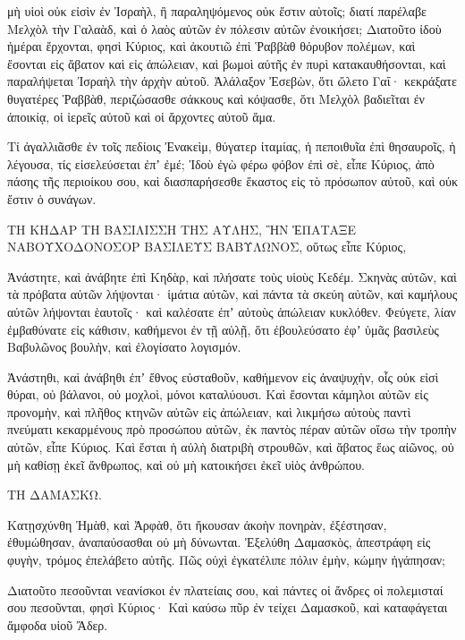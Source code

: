 {\par }{\PP μὴ υἱοὶ οὐκ εἰσὶν ἐν Ἰσραὴλ, ἢ παραληψόμενος οὐκ ἔστιν αὐτοῖς; διατί παρέλαβε Μελχὸλ τὴν Γαλαὰδ, καὶ ὁ λαὸς αὐτῶν ἐν πόλεσιν αὐτῶν ἐνοικήσει;
Διατοῦτο ἰδοὺ ἡμέραι ἔρχονται, φησὶ Κύριος, καὶ ἀκουτιῶ ἐπὶ Ῥαββὰθ θόρυβον πολέμων, καὶ ἔσονται εἰς ἄβατον καὶ εἰς ἀπώλειαν, καὶ βωμοὶ αὐτῆς ἐν πυρὶ κατακαυθήσονται, καὶ παραλήψεται Ἰσραὴλ τὴν ἀρχὴν αὐτοῦ.
Ἀλάλαξον Ἐσεβὼν, ὅτι ὤλετο Γαΐ· κεκράξατε θυγατέρες Ῥαββὰθ, περιζώσασθε σάκκους καὶ κόψασθε, ὅτι Μελχὸλ βαδιεῖται ἐν ἀποικίᾳ, οἱ ἱερεῖς αὐτοῦ καὶ οἱ ἄρχοντες αὐτοῦ ἅμα.
\par }{\PP {}Τί ἀγαλλιᾶσθε ἐν τοῖς πεδίοις Ἐνακεὶμ, θύγατερ ἰταμίας, ἡ πεποιθυῖα ἐπὶ θησαυροῖς, ἡ λέγουσα, τίς εἰσελεύσεται ἐπʼ ἐμέ;
Ἰδοὺ ἐγὼ φέρω φόβον ἐπὶ σὲ, εἶπε Κύριος, ἀπὸ πάσης τῆς περιοίκου σου, καὶ διασπαρήσεσθε ἕκαστος εἰς τὸ πρόσωπον αὐτοῦ, καὶ οὐκ ἔστιν ὁ συνάγων.
\par }{\PP {}ΤΗ ΚΗΔΑΡ ΤΗ ΒΑΣΙΛΙΣΣΗ ΤΗΣ ΑΥΛΗΣ, ἫΝ ἘΠΑΤΑΞΕ ΝΑΒΟΥΧΟΔΟΝΟΣΟΡ ΒΑΣΙΛΕΥΣ ΒΑΒΥΛΩΝΟΣ, οὕτως εἶπε Κύριος,
\par }{\PP Ἀνάστητε, καὶ ἀνάβητε ἐπὶ Κηδὰρ, καὶ πλήσατε τοὺς υἱοὺς Κεδέμ.
Σκηνὰς αὐτῶν, καὶ τὰ πρόβατα αὐτῶν λήψονται· ἱμάτια αὐτῶν, καὶ πάντα τὰ σκεύη αὐτῶν, καὶ καμήλους αὐτῶν λήψονται ἑαυτοῖς· καὶ καλέσατε ἐπʼ αὐτοὺς ἀπώλειαν κυκλόθεν.
Φεύγετε, λίαν ἐμβαθύνατε εἰς κάθισιν, καθήμενοι ἐν τῇ αὐλῇ, ὅτι ἐβουλεύσατο ἐφʼ ὑμᾶς βασιλεὺς Βαβυλῶνος βουλὴν, καὶ ἐλογίσατο λογισμόν.
\par }{\PP {}Ἀνάστηθι, καὶ ἀνάβηθι ἐπʼ ἔθνος εὐσταθοῦν, καθήμενον εἰς ἀναψυχὴν, οἷς οὐκ εἰσὶ θύραι, οὐ βάλανοι, οὐ μοχλοὶ, μόνοι καταλύουσι.
Καὶ ἔσονται κάμηλοι αὐτῶν εἰς προνομὴν, καὶ πλῆθος κτηνῶν αὐτῶν εἰς ἀπώλειαν, καὶ λικμήσω αὐτοὺς παντὶ πνεύματι κεκαρμένους πρὸ προσώπου αὐτῶν, ἐκ παντὸς πέραν αὐτῶν οἴσω τὴν τροπὴν αὐτῶν, εἶπε Κύριος.
Καὶ ἔσται ἡ αὐλὴ διατριβὴ στρουθῶν, καὶ ἄβατος ἕως αἰῶνος, οὐ μὴ καθίσῃ ἐκεῖ ἄνθρωπος, καὶ οὐ μὴ κατοικήσει ἐκεῖ υἱὸς ἀνθρώπου.
\par }{\PP {}ΤΗ ΔΑΜΑΣΚΩ.
\par }{\PP Κατῃσχύνθη Ἠμὰθ, καὶ Ἀρφὰθ, ὅτι ἤκουσαν ἀκοὴν πονηρὰν, ἐξέστησαν, ἐθυμώθησαν, ἀναπαύσασθαι οὐ μὴ δύνωνται.
Ἐξελύθη Δαμασκὸς, ἀπεστράφη εἰς φυγὴν, τρόμος ἐπελάβετο αὐτῆς.
Πῶς οὐχὶ ἐγκατέλιπε πόλιν ἐμὴν, κώμην ἠγάπησαν;
\par }{\PP {}Διατοῦτο πεσοῦνται νεανίσκοι ἐν πλατείαις σου, καὶ πάντες οἱ ἄνδρες οἱ πολεμισταί σου πεσοῦνται, φησὶ Κύριος·
Καὶ καύσω πῦρ ἐν τείχει Δαμασκοῦ, καὶ καταφάγεται ἄμφοδα υἱοῦ Ἄδερ.

}
